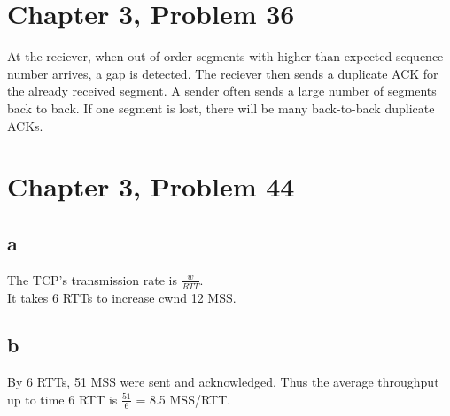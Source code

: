 \documentclass{article}
\begin{document}
\section*{Chapter 3, Problem 36}
At the reciever, when out-of-order segments with higher-than-expected sequence number arrives, a gap is detected.  The reciever then sends a duplicate ACK for the already received segment.  A sender often sends a large number of segments back to back.  If one segment is lost, there will be many back-to-back duplicate ACKs.\\

\section*{Chapter 3, Problem 44}
\subsection*{a}
The TCP's transmission rate is $\frac{w}{RTT}$.\\
\newline It takes 6 RTTs to increase cwnd 12 MSS.\\

\subsection*{b}
By 6 RTTs, 51 MSS were sent and acknowledged.  Thus the average throughput up to time 6 RTT is $\frac{51}{6}$ = 8.5 MSS/RTT.
\end{document}

